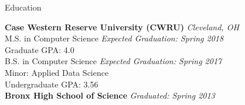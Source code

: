 \documentclass{resume} %
\begin{document}

\begin{rSection}{Education}

{\bf Case Western Reserve University (CWRU)} \hfill {\em Cleveland, OH} \\
M.S. in Computer Science \hfill {\em Expected Graduation: Spring 2018}\\ 
\setlength\parindent{24pt} \indent Graduate GPA: 4.0 \\
B.S. in Computer Science \hfill {\em Expected Graduation: Spring 2017}\\
\setlength\parindent{24pt} \indent Minor: Applied Data Science \\
\setlength\parindent{24pt} \indent Undergraduate GPA: 3.56 \\
{\bf Bronx High School of Science} \hfill {\em Graduated: Spring 2013}

\end{rSection}


\end{document}
